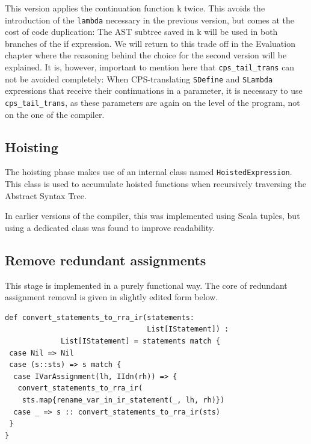\documentclass[11pt]{report}
\begin{document}
This version applies the continuation function k twice. This avoids the introduction of the \texttt{lambda} necessary in the previous version, but comes at the cost of code duplication: The AST subtree saved in k will be used in both branches of the if expression. We will return to this trade off in the Evaluation chapter where the reasoning behind the choice for the second version will be explained. It is, however, important to mention here that \texttt{cps_tail_trans} can not be avoided completely: When CPS-translating \texttt{SDefine} and \texttt{SLambda} expressions that receive their continuations in a parameter, it is necessary to use \texttt{cps_tail_trans}, as these parameters are again on the level of the program, not on the one of the compiler.


\subsection{Hoisting}
The hoisting phase makes use of an internal class named \texttt{HoistedExpression}. This class is used to accumulate hoisted functions when recursively traversing the Abstract Syntax Tree.

In earlier versions of the compiler, this was implemented using Scala tuples, but using a dedicated class was found to improve readability. 



\subsection{Remove redundant assignments}
This stage is implemented in a purely functional way. The core of redundant assignment removal is given in slightly edited form below.

\begin{lstlisting}
def convert_statements_to_rra_ir(statements: 
                                 List[IStatement]) : 
             List[IStatement] = statements match {
 case Nil => Nil
 case (s::sts) => s match {
  case IVarAssignment(lh, IIdn(rh)) => {
   convert_statements_to_rra_ir(
    sts.map{rename_var_in_ir_statement(_, lh, rh)})
  case _ => s :: convert_statements_to_rra_ir(sts)
 }
}
\end{lstlisting}
\end{document}
